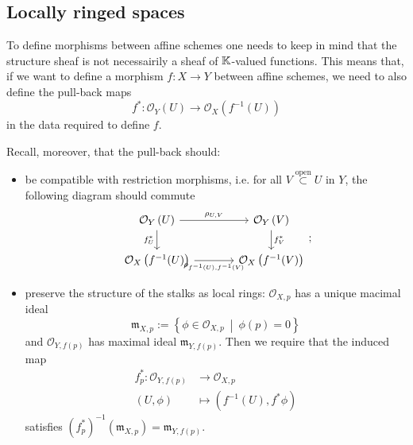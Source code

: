 \subsection{Locally ringed spaces}
\begin{rem}[]
To define morphisms between affine schemes one needs to keep in mind that
the structure sheaf is not necessairily a sheaf of $\mathbb{K}$-valued functions.
This means that, if we want to define a morphism $f: X \to Y$ between affine schemes,
we need to also define the pull-back maps
\begin{equation}
	f^*: \mathcal{O}_{Y} \left( U \right) \to \mathcal{O}_{X} \left( f^{-1}(U) \right)
\end{equation} 
in the data required to define $f$.

Recall, moreover, that the pull-back should:
\begin{itemize}
	\item be compatible with restriction morphisms, i.e. for all $V \stackrel{\text{open}}{\subset} U$ in $Y$,
		the following diagram should commute
		\begin{equation}
			\begin{tikzcd}[column sep=large]
			\mathcal{O}_{Y} \left( U \right) \arrow[r, "\rho_{U,V}", rightarrow] \arrow[d, "f^*_U"', rightarrow] &
			\mathcal{O}_{Y} \left( V \right) \arrow[d, "f^*_{V}", rightarrow] \\
			\mathcal{O}_{X} \left( f^{-1}(U) \right) \arrow[r, "\rho_{f^{-1}(U), f^{-1}(V)}"', rightarrow] &
			\mathcal{O}_{X} \left( f^{-1}(V) \right)
		\end{tikzcd}
		;\end{equation} 
	\item preserve the structure of the stalks as local rings:
		$\mathcal{O}_{X, p}$ has a unique macimal ideal
		\begin{equation}
		\mathfrak{m}_{X, p} := \left\{ \phi \in \mathcal{O}_{X, p}
		\ \middle|\ \phi(p) = 0 \right\}
		\end{equation} 
		and $\mathcal{O}_{Y, f(p)}$ has maximal ideal $\mathfrak{m}_{Y, f(p)}$.
		Then we require that the induced map
		\begin{align}
			f^*_{p}: \mathcal{O}_{Y, f(p)} &\to \mathcal{O}_{X, p} \\
			\left(U, \phi\right) &\mapsto \left(f^{-1}(U), f^* \phi\right)
		\end{align} 
		satisfies $\left( f^*_{p} \right)^{-1}(\mathfrak{m}_{X, p}) =
		\mathfrak{m}_{Y, f(p)}$.
\end{itemize}
\end{rem}

